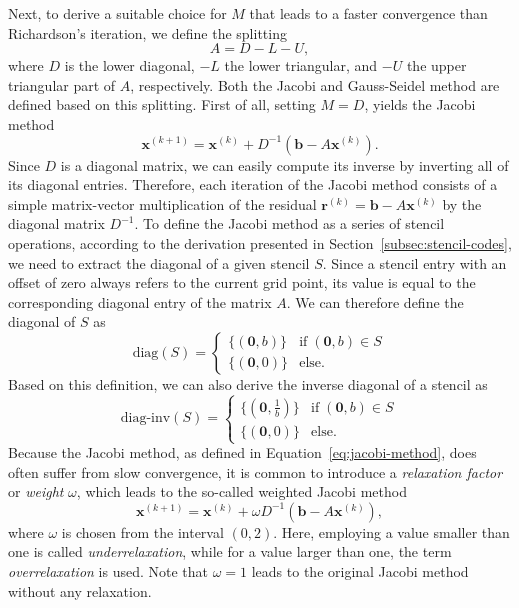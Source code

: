 Next, to derive a suitable choice for $M$ that leads to a faster convergence than Richardson's iteration, we define the splitting
\begin{equation}
	A = D - L - U,
\end{equation} 
where $D$ is the lower diagonal, $-L$ the lower triangular, and $-U$ the upper triangular part of $A$, respectively.
Both the Jacobi and Gauss-Seidel method are defined based on this splitting.
First of all, setting $M = D$, yields the Jacobi method
\begin{equation}
	\bm{x}^{(k+1)} = \bm{x}^{(k)} + D^{-1}(\bm b - A \bm{x}^{(k)}).
	\label{eq:jacobi-method}
\end{equation}
Since $D$ is a diagonal matrix, we can easily compute its inverse by inverting all of its diagonal entries.
Therefore, each iteration of the Jacobi method consists of a simple matrix-vector multiplication of the residual $\bm{r}^{(k)} = \bm{b} - A \bm{x}^{(k)}$ by the diagonal matrix $D^{-1}$.
To define the Jacobi method as a series of stencil operations, according to the derivation presented in Section~\ref{subsec:stencil-codes}, we need to extract the diagonal of a given stencil $S$.
Since a stencil entry with an offset of zero always refers to the current grid point, its value is equal to the corresponding diagonal entry of the matrix $A$.
We can therefore define the diagonal of $S$ as
\begin{equation}
	\text{diag}(S) = \begin{cases}
		\{(\bm{0}, b) \} & \text{if} \; (\bm 0, b) \in S \\
		\{(\bm{0}, 0) \} & \text{else}.
	\end{cases}
	\label{eq:stencil-diag}
\end{equation}
Based on this definition, we can also derive the inverse diagonal of a stencil as
\begin{equation}
	\text{diag-inv}(S) = \begin{cases}
		\{(\bm{0}, \frac{1}{b}) \} & \text{if} \; (\bm 0, b) \in S \\
		\{(\bm{0}, 0) \} & \text{else}.
	\end{cases}
	\label{eq:stencil-diag-inv}
\end{equation}
Because the Jacobi method, as defined in Equation~\eqref{eq:jacobi-method}, does often suffer from slow convergence, it is common to introduce a \emph{relaxation factor} or \emph{weight} $\omega$, which leads to the so-called weighted Jacobi method
\begin{equation}
	\bm{x}^{(k+1)} = \bm{x}^{(k)} + \omega D^{-1}(\bm b - A \bm{x}^{(k)}),
	\label{eq:weighted-jacobi-method}
\end{equation}
where $\omega$ is chosen from the interval $\left(0, 2\right)$.
Here, employing a value smaller than one is called \emph{underrelaxation}, while for a value larger than one, the term \emph{overrelaxation} is used.
Note that $\omega = 1$ leads to the original Jacobi method without any relaxation.

